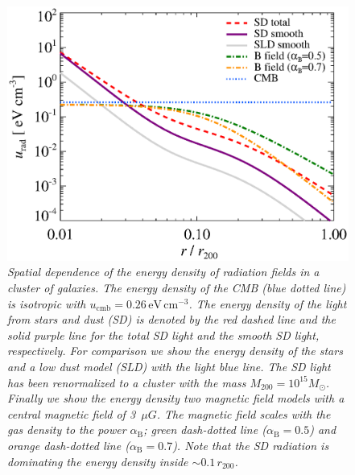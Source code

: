 \documentclass[10pt,aps,pra,reprint,amsmath,amsfonts,amssymb,showpacs,nofootinbib,floatfix]{revtex4-1}
\newcommand{\rmn}{\mathrm}
\newcommand{\msun}{M_\odot}
\newcommand{\rvir}{r_{200}}
\newcommand{\mvir}{M_{200}}
\begin{document}
\begin{figure}%
 \includegraphics[width=0.99\columnwidth]{figures/ucool.eps}
 \caption{\it Spatial dependence of the energy density of radiation
   fields in a cluster of galaxies. The energy density of the CMB
   (blue dotted line) is isotropic with
   $u_\rmn{cmb}=0.26\,\rmn{eV}\,\rmn{cm}^{-3}$. The energy density of
   the light from stars and dust (SD) is denoted by the red dashed
   line and the solid purple line for the total SD light and the
   smooth SD light, respectively. For comparison we show the energy
   density of the stars and a low dust model (SLD) with the light blue
   line. The SD light has been renormalized to a cluster with the mass
   $\mvir=10^{15}\msun$. Finally we show the energy density two
   magnetic field models with a central magnetic field of 3~$\mu
   G$. The magnetic field scales with the gas density to the power
   $\alpha_\rmn{B}$; green dash-dotted line ($\alpha_\rmn{B}=0.5$) and
   orange dash-dotted line ($\alpha_\rmn{B}=0.7$). Note that the SD
   radiation is dominating the energy density inside
   $\sim0.1\,\rvir$.}
 \label{fig:SD_Edens}
\end{figure}
\end{document}
